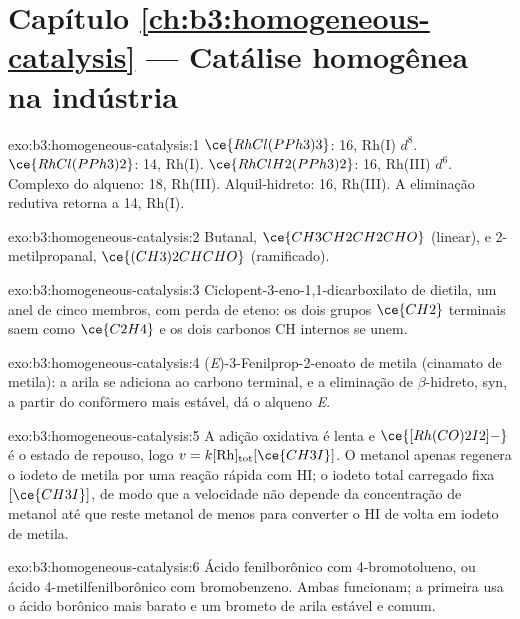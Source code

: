 \section*{Capítulo \ref{ch:b3:homogeneous-catalysis} --- Catálise homogênea na indústria}

\begin{solution}{exo:b3:homogeneous-catalysis:1}
$\ce{RhCl(PPh3)3}$: 16, Rh(I) $d^8$. $\ce{RhCl(PPh3)2}$: 14, Rh(I). $\ce{RhClH2(PPh3)2}$: 16, Rh(III) $d^6$.
Complexo do alqueno: 18, Rh(III). Alquil-hidreto: 16, Rh(III). A eliminação redutiva
retorna a 14, Rh(I).
\end{solution}

\begin{solution}{exo:b3:homogeneous-catalysis:2}
Butanal, $\ce{CH3CH2CH2CHO}$ (linear), e 2-metilpropanal, $\ce{(CH3)2CHCHO}$ (ramificado).
\end{solution}

\begin{solution}{exo:b3:homogeneous-catalysis:3}
Ciclopent-3-eno-1,1-dicarboxilato de dietila, um anel de cinco membros, com perda de
eteno: os dois grupos $\ce{CH2}$ terminais saem como $\ce{C2H4}$ e os dois carbonos CH internos
se unem.
\end{solution}

\begin{solution}{exo:b3:homogeneous-catalysis:4}
(\textit{E})-3-Fenilprop-2-enoato de metila (cinamato de metila): a arila se adiciona ao
carbono terminal, e a eliminação de $\beta$-hidreto, syn, a partir do confôrmero mais estável,
dá o alqueno \textit{E}.
\end{solution}

\begin{solution}{exo:b3:homogeneous-catalysis:5}
A adição oxidativa é lenta e $\ce{[Rh(CO)2I2]-}$ é o estado de repouso, logo
$v = k[\mathrm{Rh}]_{\mathrm{tot}}[\ce{CH3I}]$. O metanol apenas regenera o iodeto de metila por uma reação rápida com HI;
o iodeto total carregado fixa $[\ce{CH3I}]$, de modo que a velocidade não depende da concentração de
metanol até que reste metanol de menos para converter o HI de volta em
iodeto de metila.
\end{solution}

\begin{solution}{exo:b3:homogeneous-catalysis:6}
Ácido fenilborônico com 4-bromotolueno, ou ácido 4-metilfenilborônico com
bromobenzeno. Ambas funcionam; a primeira usa o ácido borônico mais barato e um brometo de arila
estável e comum.
\end{solution}

